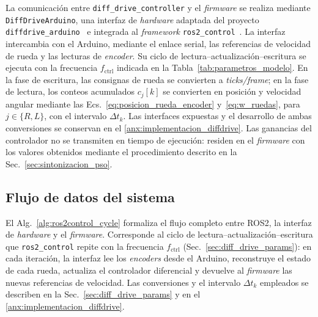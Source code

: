 La comunicación entre \texttt{diff\_drive\_controller} y el \textit{firmware} se
realiza mediante \texttt{DiffDriveArduino}, una interfaz de \textit{hardware} adaptada
del proyecto \texttt{diffdrive\_arduino}~\citep{newans_diffdrive} e integrada
al \textit{framework} \texttt{ros2\_control}~\citep{openrobotics2024ros2control}. La
interfaz intercambia con el \gls{Arduino}, mediante el enlace serial, las
referencias de velocidad de rueda y las lecturas de \textit{encoder}. Su ciclo de lectura--actualización--escritura se ejecuta con la
frecuencia $f_{\mathrm{ctrl}}$ indicada en la
Tabla~\ref{tab:parametros_modelo}.
En la fase de escritura, las consignas de rueda se convierten a
\textit{ticks/frame}; en la fase de
lectura, los conteos acumulados $c_j[k]$ se convierten en posición y
velocidad angular mediante las Ecs.~\eqref{eq:posicion_rueda_encoder}
y~\eqref{eq:w_ruedas}, para $j\in\{R,L\}$, con el intervalo $\Delta t_k$. Las interfaces expuestas y el
desarrollo de ambas conversiones se conservan en el
\ref{anx:implementacion_diffdrive}.
Las ganancias del controlador no se transmiten en tiempo de ejecución: residen en el
\textit{firmware} con los valores obtenidos mediante el procedimiento descrito en la
Sec.~\ref{sec:sintonizacion_pso}.

\subsection{Flujo de datos del sistema}
\label{sec:flujo_datos}

El Alg.~\ref{alg:ros2control_cycle} formaliza el flujo completo entre
\gls{ROS2}, la interfaz de \textit{hardware} y el \textit{firmware}. Corresponde al ciclo de
lectura--actualización--escritura que \texttt{ros2\_control} repite con la
frecuencia $f_{\mathrm{ctrl}}$ (Sec.~\ref{sec:diff_drive_params}): en cada
iteración, la interfaz lee los \textit{encoders} desde el \gls{Arduino}, reconstruye el
estado de cada rueda, actualiza el controlador diferencial y devuelve al
\textit{firmware} las nuevas referencias de velocidad. Las conversiones y el intervalo
$\Delta t_k$ empleados se describen en la Sec.~\ref{sec:diff_drive_params} y en
el \ref{anx:implementacion_diffdrive}.

